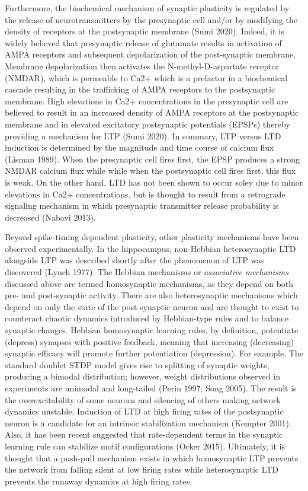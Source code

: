 \documentclass{ucetd}
\begin{document}
Furthermore, the biochemical mechanism of synaptic plasticity is regulated by the release of neurotransmitters by the presynaptic cell and/or by modifying the density of receptors at the postsynaptic membrane (Sumi 2020). Indeed, it is widely believed that presynaptic release of glutamate results in activation of AMPA receptors and subsequent depolarization of the post-synaptic membrane. Membrane depolarization then activates the N-methyl-D-aspartate receptor (NMDAR), which is permeable to Ca2+ which is a prefactor in a biochemical cascade resulting in the trafficking of AMPA receptors to the postsynaptic membrane. High elevations in Ca2+ concentrations in the presynaptic cell are believed to result in an increased density of AMPA receptors at the postsynaptic membrane and in elevated excitatory postsynaptic potentials (EPSPs) thereby providing a mechanism for LTP (Sumi 2020). In summary, LTP versus LTD induction is determined by the magnitude and time course of calcium flux (Lisman 1989). When the presynaptic cell fires first, the EPSP produces a strong NMDAR calcium flux while while when the postsynaptic cell fires first, this flux is weak. On the other hand, LTD has not been shown to occur soley due to minor elevations in Ca2+ concentrations, but is thought to result from a retrograde signaling mechanism in which presynaptic transmitter release probability is decreased (Nabavi 2013).

Beyond spike-timing dependent plasticity, other plasticity mechanisms have been observed experimentally. In the hippocampus, non-Hebbian heterosynaptic LTD alongside LTP was described shortly after the phenomenon of LTP was discovered (Lynch 1977). The Hebbian mechanisms or \emph{associative mechanisms} discussed above are termed homosynaptic mechanisms, as they depend on both pre- and post-synaptic activity. There are also heterosynaptic mechanisms which depend on only the state of the post-synaptic neuron and are thought to exist to counteract chaotic dynamics introduced by Hebbian-type rules and to balance synaptic changes. Hebbian homosynaptic learning rules, by definition, potentiate (depress) synapses with positive feedback, meaning that increasing (decreasing) synaptic efficacy will promote further potentiation (depression). For example, The standard doublet STDP model gives rise to splitting of synaptic weights, producing a bimodal distribution; however, weight distributions observed in experiments are unimodal and long-tailed (Perin 1997; Song 2005). The result is the overexcitability of some neurons and silencing of others making network dynamics unstable. Induction of LTD at high firing rates of the postsynaptic neuron is a candidate for an intrinsic stabilization mechanism (Kempter 2001). Also, it has been recent suggested that rate-dependent terms in the synaptic learning rule can stabilize motif configurations (Ocker 2015). Ultimately, it is thought that a push-pull mechanism exists in which homosynaptic LTP prevents the network from falling silent at low firing rates while heterosynaptic LTD prevents the runaway dynamics at high firing rates.
\end{document}
